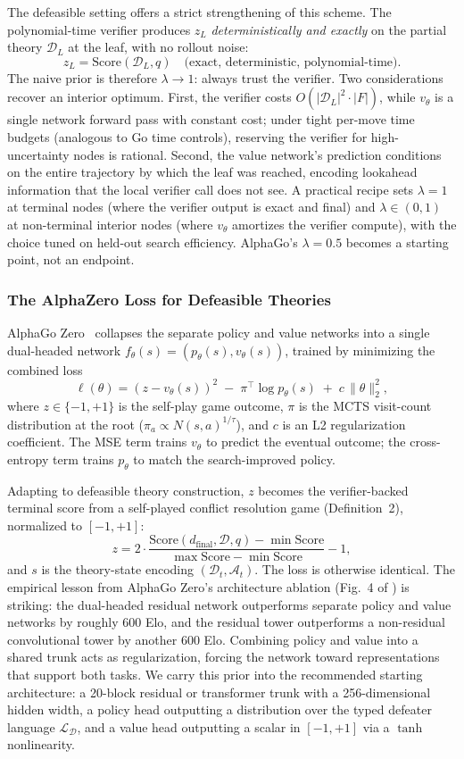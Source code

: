 \documentclass{article}
\newcommand{\D}{\mathcal{D}}
\newcommand{\Score}{\mathrm{Score}}
\begin{document}
The defeasible setting offers a strict strengthening of this scheme. The polynomial-time verifier produces $z_L$ \emph{deterministically and exactly} on the partial theory $\D_L$ at the leaf, with no rollout noise:
\[
    z_L = \Score(\D_L, q) \quad \text{(exact, deterministic, polynomial-time)}.
\]
The naive prior is therefore $\lambda \to 1$: always trust the verifier. Two considerations recover an interior optimum. First, the verifier costs $O(|\D_L|^2 \cdot |F|)$, while $v_\theta$ is a single network forward pass with constant cost; under tight per-move time budgets (analogous to Go time controls), reserving the verifier for high-uncertainty nodes is rational. Second, the value network's prediction conditions on the entire trajectory by which the leaf was reached, encoding lookahead information that the local verifier call does not see. A practical recipe sets $\lambda = 1$ at terminal nodes (where the verifier output is exact and final) and $\lambda \in (0, 1)$ at non-terminal interior nodes (where $v_\theta$ amortizes the verifier compute), with the choice tuned on held-out search efficiency. AlphaGo's $\lambda = 0.5$ becomes a starting point, not an endpoint.

\subsubsection{The AlphaZero Loss for Defeasible Theories}

AlphaGo Zero~\cite{silver2017alphagozero} collapses the separate policy and value networks into a single dual-headed network $f_\theta(s) = (p_\theta(s), v_\theta(s))$, trained by minimizing the combined loss
\[
    \ell(\theta) = (z - v_\theta(s))^2 \;-\; \pi^\top \log p_\theta(s) \;+\; c \, \|\theta\|^2_2,
\]
where $z \in \{-1, +1\}$ is the self-play game outcome, $\pi$ is the MCTS visit-count distribution at the root ($\pi_a \propto N(s, a)^{1/\tau}$), and $c$ is an L2 regularization coefficient. The MSE term trains $v_\theta$ to predict the eventual outcome; the cross-entropy term trains $p_\theta$ to match the search-improved policy.

Adapting to defeasible theory construction, $z$ becomes the verifier-backed terminal score from a self-played conflict resolution game (Definition~2), normalized to $[-1, +1]$:
\[
    z = 2 \cdot \frac{\Score(d_{\mathrm{final}}, \D, q) - \min \Score}{\max \Score - \min \Score} - 1,
\]
and $s$ is the theory-state encoding $(\D_t, \mathcal{A}_t)$. The loss is otherwise identical. The empirical lesson from AlphaGo Zero's architecture ablation (Fig.~4 of \cite{silver2017alphagozero}) is striking: the dual-headed residual network outperforms separate policy and value networks by roughly 600 Elo, and the residual tower outperforms a non-residual convolutional tower by another 600 Elo. Combining policy and value into a shared trunk acts as regularization, forcing the network toward representations that support both tasks. We carry this prior into the recommended starting architecture: a 20-block residual or transformer trunk with a 256-dimensional hidden width, a policy head outputting a distribution over the typed defeater language $\mathcal{L}_\D$, and a value head outputting a scalar in $[-1, +1]$ via a $\tanh$ nonlinearity.
\end{document}
